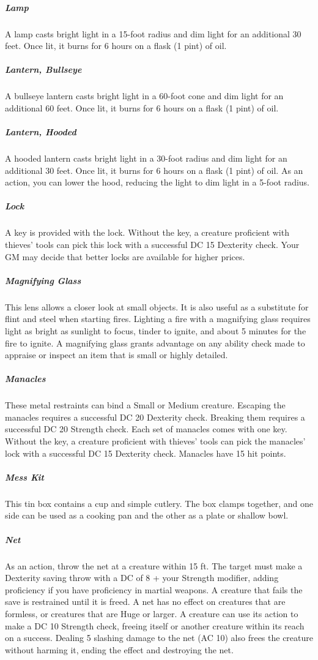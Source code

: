 \subparagraph*{Lamp} A lamp casts bright light in a 15-foot radius and dim light for an additional 30 feet. Once lit, it burns for 6 hours on a flask (1 pint) of oil.
\subparagraph*{Lantern, Bullseye} A bullseye lantern casts bright light in a 60-foot cone and dim light for an additional 60 feet. Once lit, it burns for 6 hours on a flask (1 pint) of oil.
\subparagraph*{Lantern, Hooded} A hooded lantern casts bright light in a 30-foot radius and dim light for an additional 30 feet. Once lit, it burns for 6 hours on a flask (1 pint) of oil. As an action, you can lower the hood, reducing the light to dim light in a 5-foot radius.

\subparagraph*{Lock} A key is provided with the lock. Without the key, a creature proficient with thieves' tools can pick this lock with a successful DC 15 Dexterity check. Your GM may decide that better locks are available for higher prices.

\subparagraph*{Magnifying Glass} This lens allows a closer look at small objects. It is also useful as a substitute for flint and steel when starting fires. Lighting a fire with a magnifying glass requires light as bright as sunlight to focus, tinder to ignite, and about 5 minutes for the fire to ignite. A magnifying glass grants advantage on any ability check made to appraise or inspect an item that is small or highly detailed.

\subparagraph*{Manacles} These metal restraints can bind a Small or Medium creature. Escaping the manacles requires a successful DC 20 Dexterity check. Breaking them requires a successful DC 20 Strength check. Each set of manacles comes with one key. Without the key, a creature proficient with thieves' tools can pick the manacles' lock with a successful DC 15 Dexterity check. Manacles have 15 hit points.

\subparagraph*{Mess Kit} This tin box contains a cup and simple cutlery. The box clamps together, and one side can be used as a cooking pan and the other as a plate or shallow bowl.

\subparagraph*{Net} As an action, throw the net at a creature within 15 ft. The target must make a Dexterity saving throw with a DC of 8 + your Strength modifier, adding proficiency if you have proficiency in martial weapons. A creature that fails the save is restrained until it is freed. A net has no effect on creatures that are formless, or creatures that are Huge or larger. A creature can use its action to make a DC 10 Strength check, freeing itself or another creature within its reach on a success. Dealing 5 slashing damage to the net (AC 10) also frees the creature without harming it, ending the effect and destroying the net.

